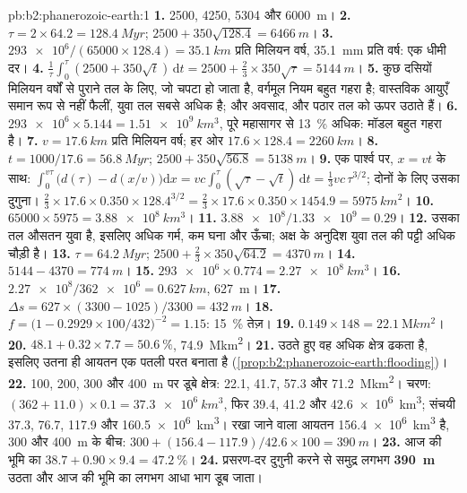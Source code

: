 \begin{solution}{pb:b2:phanerozoic-earth:1}
\textbf{1.} 2500, 4250, 5304 और \qty{6000}{m}।
\textbf{2.} $\tau = 2 \times 64.2 = \qty{128.4}{Myr}$; $2500 + 350\sqrt{128.4} = \qty{6466}{m}$।
\textbf{3.} $\num{293e6}/(65000 \times 128.4) = \qty{35.1}{km}$ प्रति मिलियन वर्ष,
\qty{35.1}{mm} प्रति वर्ष: एक धीमी दर।
\textbf{4.} $\frac1\tau\int_0^\tau(2500 + 350\sqrt t)\,\mathrm{d}t = 2500 + \frac23 \times
350\sqrt\tau = \qty{5144}{m}$।
\textbf{5.} कुछ दसियों मिलियन वर्षों से पुराने तल के लिए, जो चपटा हो जाता है, वर्गमूल नियम बहुत गहरा है;
वास्तविक आयुएँ समान रूप से नहीं फैलीं, युवा तल सबसे अधिक है; और
अवसाद,  और पठार तल को ऊपर उठाते हैं।
\textbf{6.} $\num{293e6} \times 5.144 = \qty{1.51e9}{km^3}$, पूरे महासागर से \qty{13}{\percent}
अधिक: मॉडल बहुत गहरा है।
\textbf{7.} $v = \qty{17.6}{km}$ प्रति मिलियन वर्ष; हर ओर
$17.6 \times 128.4 = \qty{2260}{km}$।
\textbf{8.} $t = 1000/17.6 = \qty{56.8}{Myr}$; $2500 + 350\sqrt{56.8} = \qty{5138}{m}$।
\textbf{9.} एक पार्श्व पर, $x = vt$ के साथ: $\int_0^{v\tau}\bigl(d(\tau) - d(x/v)\bigr)\mathrm{d}x
= vc\int_0^\tau(\sqrt\tau - \sqrt t)\,\mathrm{d}t = \frac13 vc\,\tau^{3/2}$; दोनों के लिए उसका दुगुना।
$\frac23 \times 17.6 \times 0.350 \times 128.4^{3/2} = \frac23 \times 17.6 \times 0.350 \times
1454.9 = \qty{5975}{km^2}$।
\textbf{10.} $65000 \times 5975 = \qty{3.88e8}{km^3}$।
\textbf{11.} $\num{3.88e8}/\num{1.33e9} = 0.29$।
\textbf{12.} उसका तल औसतन युवा है, इसलिए अधिक गर्म, कम घना और ऊँचा; अक्ष के अनुदिश युवा
तल की पट्टी अधिक चौड़ी है।
\textbf{13.} $\tau = \qty{64.2}{Myr}$; $2500 + \frac23 \times 350\sqrt{64.2} = \qty{4370}{m}$।
\textbf{14.} $5144 - 4370 = \qty{774}{m}$।
\textbf{15.} $\num{293e6} \times 0.774 = \qty{2.27e8}{km^3}$।
\textbf{16.} $\num{2.27e8}/\num{362e6} = \qty{0.627}{km}$, \qty{627}{m}।
\textbf{17.} $\Delta s = 627 \times (3300 - 1025)/3300 = \qty{432}{m}$।
\textbf{18.} $f = \bigl(1 - 0.2929 \times 100/432\bigr)^{-2} = 1.15$: \qty{15}{\percent} तेज़।
\textbf{19.} $0.149 \times 148 = \qty{22.1}{\mega km^2}$।
\textbf{20.} $48.1 + 0.32 \times 7.7 = \qty{50.6}{\percent}$, \qty{74.9}{\mega km^2}।
\textbf{21.} उठते हुए वह अधिक क्षेत्र ढकता है, इसलिए उतना ही आयतन एक पतली परत बनाता है
(\cref{prop:b2:phanerozoic-earth:flooding})।
\textbf{22.} 100, 200, 300 और \qty{400}{m} पर डूबे क्षेत्र: 22.1, 41.7, 57.3 और
\qty{71.2}{\mega km^2}। चरण: $(362 + 11.0) \times 0.1 = \qty{37.3e6}{km^3}$, फिर 39.4, 41.2
और \qty{42.6e6}{km^3}; संचयी 37.3, 76.7, 117.9 और \qty{160.5e6}{km^3}। रखा जाने वाला आयतन
\qty{156.4e6}{km^3} है, 300 और \qty{400}{m} के बीच: $300 + (156.4 - 117.9)/42.6 \times 100
= \qty{390}{m}$।
\textbf{23.} आज की भूमि का $38.7 + 0.90 \times 9.4 = \qty{47.2}{\percent}$।
\textbf{24.} प्रसरण-दर दुगुनी करने से समुद्र लगभग \textbf{\qty{390}{m}} उठता और
आज की भूमि का लगभग आधा भाग डूब जाता।
\end{solution}
